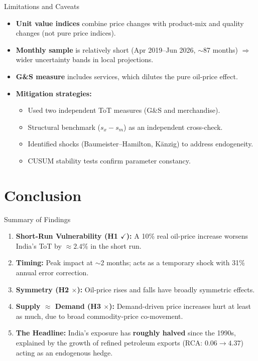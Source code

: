 \documentclass[10pt,aspectratio=169]{beamer}
\begin{document}
\begin{frame}{Limitations and Caveats}
  \begin{itemize}
    \item \textbf{Unit value indices} combine price changes with product-mix and quality changes (not pure price indices).
    \item \textbf{Monthly sample} is relatively short (Apr 2019--Jun 2026, $\sim$87 months) $\Rightarrow$ wider uncertainty bands in local projections.
    \item \textbf{G\&S measure} includes services, which dilutes the pure oil-price effect.
    \vspace{0.3cm}
    \item \textbf{Mitigation strategies:}
    \begin{itemize}
      \item Used two independent ToT measures (G\&S and merchandise).
      \item Structural benchmark ($s_x - s_m$) as an independent cross-check.
      \item Identified shocks (Baumeister--Hamilton, K\"anzig) to address endogeneity.
      \item CUSUM stability tests confirm parameter constancy.
    \end{itemize}
  \end{itemize}
\end{frame}

\section{Conclusion}

\begin{frame}{Summary of Findings}
  \begin{enumerate}
    \item \textbf{Short-Run Vulnerability (H1 $\checkmark$):} A 10\% real oil-price increase worsens India's ToT by $\approx 2.4\%$ in the short run.
    \vspace{0.2cm}
    \item \textbf{Timing:} Peak impact at $\sim$2 months; acts as a temporary shock with 31\% annual error correction.
    \vspace{0.2cm}
    \item \textbf{Symmetry (H2 $\times$):} Oil-price rises and falls have broadly symmetric effects.
    \vspace{0.2cm}
    \item \textbf{Supply $\approx$ Demand (H3 $\times$):} Demand-driven price increases hurt at least as much, due to broad commodity-price co-movement.
    \vspace{0.2cm}
    \item \textbf{The Headline:} India's exposure has \textbf{roughly halved} since the 1990s, explained by the growth of refined petroleum exports (RCA: $0.06 \to 4.37$) acting as an endogenous hedge.
  \end{enumerate}
\end{frame}
\end{document}
